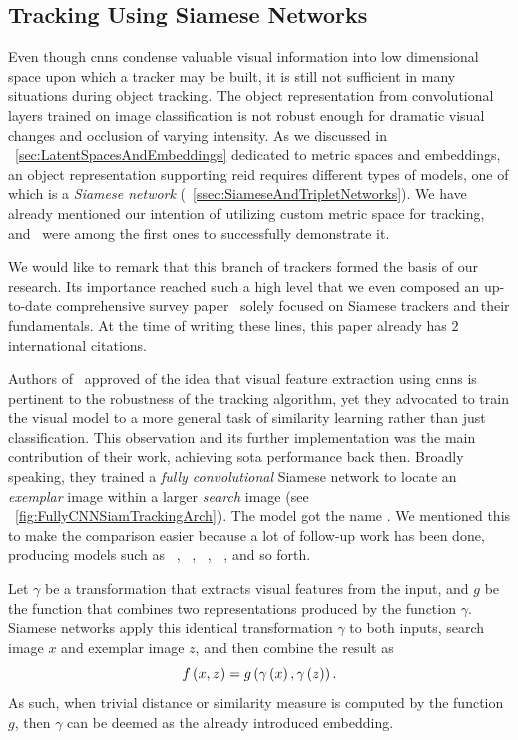 \subsection{Tracking Using Siamese Networks}
\label{ssec:TrackingUsingSiameseNetworks}

Even though \glspl{cnn} condense valuable visual information into low dimensional space upon which a tracker may be built, it is still not sufficient in many situations during object tracking. The object representation from convolutional layers trained on image classification is not robust enough for dramatic visual changes and occlusion of varying intensity. As we discussed in \sectionstr{}~\ref{sec:LatentSpacesAndEmbeddings} dedicated to metric spaces and embeddings, an object representation supporting \gls{reid} requires different types of models, one of which is a \emph{Siamese network} (\sectionstr{}~\ref{ssec:SiameseAndTripletNetworks}). We have already mentioned our intention of utilizing custom metric space for tracking, and~\cite{bertinetto2016siamfc} were among the first ones to successfully demonstrate it.

We would like to remark that this branch of trackers formed the basis of our research. Its importance reached such a high level that we even composed an up-to-date comprehensive survey paper~\cite{ondrasovic2021siamese} solely focused on Siamese trackers and their fundamentals. At the time of writing these lines, this paper already has $2$ international citations.

Authors of~\cite{bertinetto2016siamfc} approved of the idea that visual feature extraction using \glspl{cnn} is pertinent to the robustness of the tracking algorithm, yet they advocated to train the visual model to a more general task of similarity learning rather than just classification. This observation and its further implementation was the main contribution of their work, achieving \gls{sota} performance back then. Broadly speaking, they trained a \emph{fully convolutional} Siamese network to locate an \emph{exemplar} image within a larger \emph{search} image (see \figstr{}~\ref{fig:FullyCNNSiamTrackingArch}). The model got the name \siamfc{}. We mentioned this to make the comparison easier because a lot of follow-up work has been done, producing models such as \sasiam{}~\cite{he2018twofoldsiam}, \siamrpn{}~\cite{li2018siamrpn}, \siammask{}~\cite{wang2019siammask}, \siammaske{}~\cite{chen2019rotbboxes}, and so forth.

Let $\gamma$ be a transformation that extracts visual features from the input, and $g$ be the function that combines two representations produced by the function $\gamma$. Siamese networks apply this identical transformation $\gamma$ to both inputs, search image $x$ and exemplar image $z$, and then combine the result as
\begin{equation}
    {f} \left( x, z \right) = {g} \left( {\gamma} \left( x \right), {\gamma} \left( z \right) \right).
\end{equation}
As such, when trivial distance or similarity measure is computed by the function $g$, then $\gamma$ can be deemed as the already introduced embedding.


